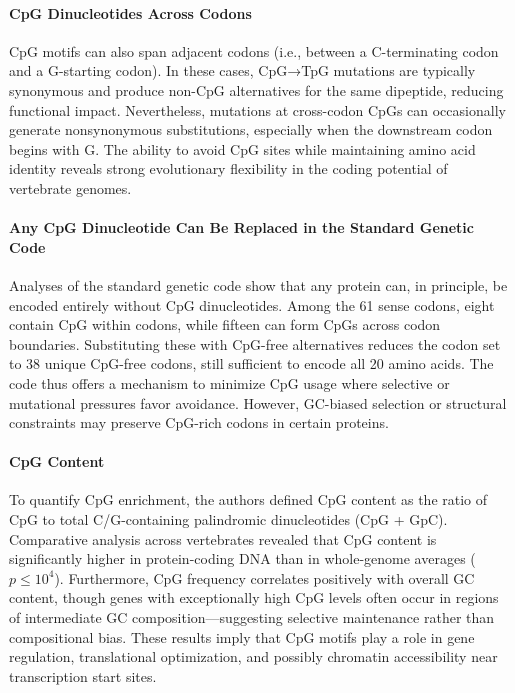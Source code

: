 \documentclass[10pt]{extarticle}
\begin{document}
\paragraph{CpG Dinucleotides Across Codons}
CpG motifs can also span adjacent codons (i.e., between a C-terminating codon and a G-starting codon). In these cases, CpG→TpG mutations are typically synonymous and produce non-CpG alternatives for the same dipeptide, reducing functional impact. Nevertheless, mutations at cross-codon CpGs can occasionally generate nonsynonymous substitutions, especially when the downstream codon begins with G. The ability to avoid CpG sites while maintaining amino acid identity reveals strong evolutionary flexibility in the coding potential of vertebrate genomes.

\paragraph{Any CpG Dinucleotide Can Be Replaced in the Standard Genetic Code}
Analyses of the standard genetic code show that any protein can, in principle, be encoded entirely without CpG dinucleotides. Among the 61 sense codons, eight contain CpG within codons, while fifteen can form CpGs across codon boundaries. Substituting these with CpG-free alternatives reduces the codon set to 38 unique CpG-free codons, still sufficient to encode all 20 amino acids. The code thus offers a mechanism to minimize CpG usage where selective or mutational pressures favor avoidance. However, GC-biased selection or structural constraints may preserve CpG-rich codons in certain proteins.

\paragraph{CpG Content}
To quantify CpG enrichment, the authors defined CpG content as the ratio of CpG to total C/G-containing palindromic dinucleotides (CpG + GpC). Comparative analysis across vertebrates revealed that CpG content is significantly higher in protein-coding DNA than in whole-genome averages ($p\leq 10^4$). Furthermore, CpG frequency correlates positively with overall GC content, though genes with exceptionally high CpG levels often occur in regions of intermediate GC composition—suggesting selective maintenance rather than compositional bias. These results imply that CpG motifs play a role in gene regulation, translational optimization, and possibly chromatin accessibility near transcription start sites.
\end{document}
